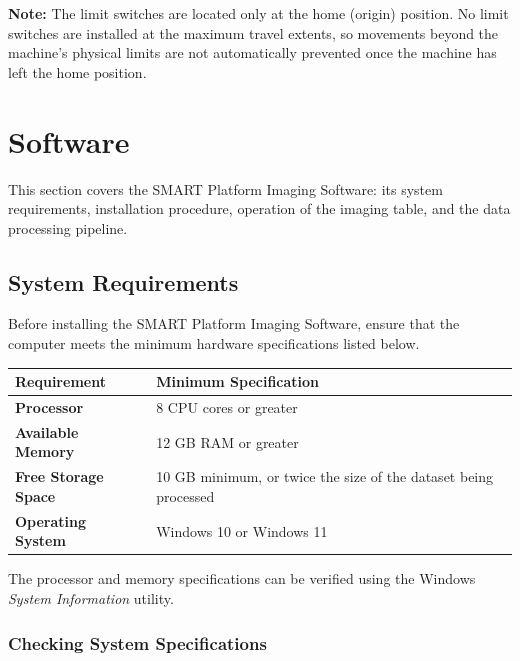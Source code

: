 \documentclass[12pt,a4paper,oneside]{report}
\begin{document}
\noindent\textbf{Note:} The limit switches are located only at the home (origin) position. No limit switches are installed at the maximum travel extents, so movements beyond the machine's physical limits are not automatically prevented once the machine has left the home position.
\section{Software}

This section covers the SMART Platform Imaging Software: its system requirements, installation procedure, operation of the imaging table, and the data processing pipeline.

\subsection{System Requirements}

Before installing the SMART Platform Imaging Software, ensure that the computer meets the minimum hardware specifications listed below.

\begin{table}[h]
	\centering
	\begin{tabular}{>{\bfseries}l l}
		\toprule
		Requirement        & Minimum Specification \\
		\midrule           
		Processor          & 8 CPU cores or greater \\
		Available Memory   & 12 GB RAM or greater \\
		Free Storage Space & 10 GB minimum, or twice the size of the dataset being processed \\
		Operating System   & Windows 10 or Windows 11 \\
		\bottomrule
	\end{tabular}
\end{table}

\vspace{0.5cm}

The processor and memory specifications can be verified using the Windows \textit{System Information} utility.

\subsubsection*{Checking System Specifications}
\end{document}
